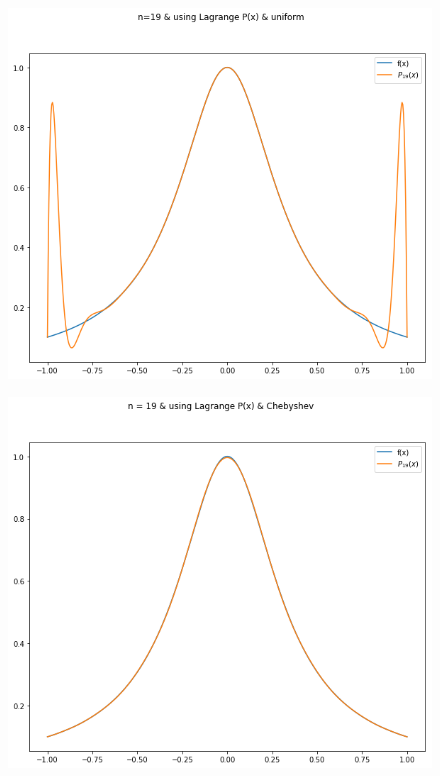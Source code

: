 \documentclass[a4paper]{article}
\begin{document}
\begin{figure}[!ht]
\includegraphics[scale=0.5]{19&u.png}
\end{figure}
\begin{figure}[!ht]
\includegraphics[scale=0.5]{19&C.png}
\end{figure}
\end{document}
